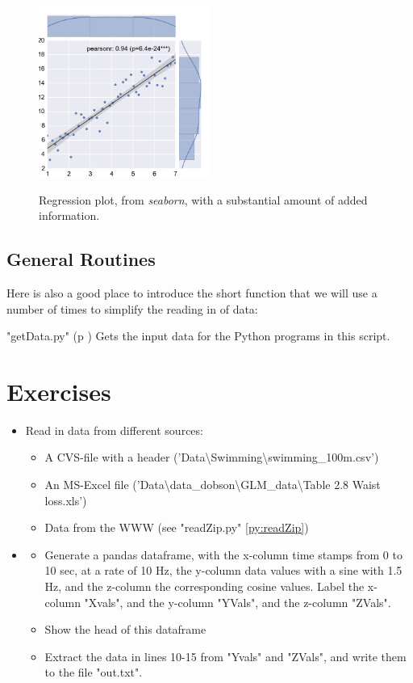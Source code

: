 \begin{figure}[ht]
  \centering
  \includegraphics[width=0.5\textwidth]{../Images/regplot.png}\\
  \caption{Regression plot, from \emph{seaborn}, with a substantial amount of added information.}
\end{figure}

\subsection{General Routines}
Here is also a good place to introduce the short function that we will use a number of times to simplify the reading in of data:

\PyImg "getData.py" (p \pageref{py:getData}) Gets the input data for the Python programs in this script.

\section{Exercises}

\begin{itemize}
  \item Read in data from different sources:
  \begin{itemize}
    \item A CVS-file with a header ('Data\textbackslash Swimming\textbackslash swimming\_100m.csv')
    \item An MS-Excel file ('Data\textbackslash data\_dobson\textbackslash GLM\_data\textbackslash Table 2.8 Waist loss.xls')
    \item Data from the WWW (see "readZip.py" \ref{py:readZip})
  \end{itemize}
  \item
  \begin{itemize}
      \item Generate a pandas dataframe, with the x-column time stamps from 0 to 10 sec, at a rate of 10 Hz, the y-column data values with a sine with 1.5 Hz, and the z-column the corresponding cosine values. Label the x-column "Xvals", and the y-column "YVals", and the z-column "ZVals".
      \item Show the head of this dataframe
      \item Extract the data in lines 10-15 from "Yvals" and "ZVals", and write them to the file "out.txt".
  \end{itemize}
\end{itemize}
